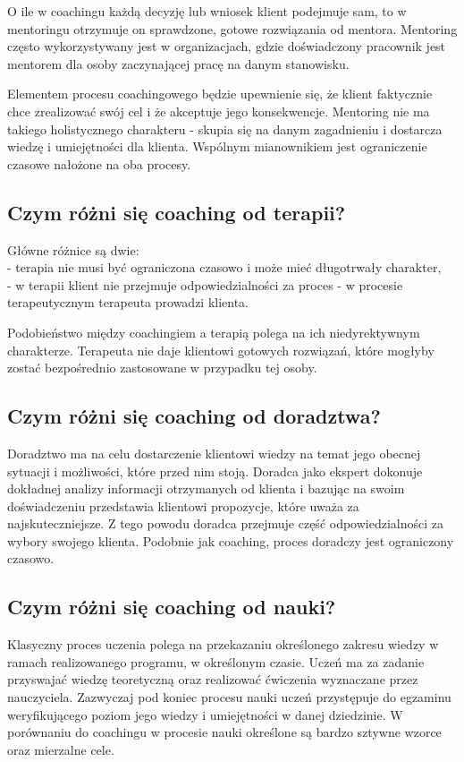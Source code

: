 O ile w coachingu każdą decyzję lub wniosek klient podejmuje sam, to w mentoringu otrzymuje on sprawdzone, gotowe rozwiązania od mentora.
Mentoring często wykorzystywany jest w organizacjach, gdzie doświadczony pracownik jest mentorem dla osoby zaczynającej pracę na danym stanowisku.

Elementem procesu coachingowego będzie upewnienie się, że klient faktycznie chce zrealizować swój cel i że akceptuje jego konsekwencje.
Mentoring nie ma takiego holistycznego charakteru - skupia się na danym zagadnieniu i dostarcza wiedzę i umiejętności dla klienta.
Wspólnym mianownikiem jest ograniczenie czasowe nałożone na oba procesy.

\subsection{Czym różni się coaching od terapii?}
Główne różnice są dwie: \\
- terapia nie musi być ograniczona czasowo i może mieć długotrwały charakter, \\
- w terapii klient nie przejmuje odpowiedzialności za proces - w procesie terapeutycznym terapeuta prowadzi klienta.

Podobieństwo między coachingiem a terapią polega na ich niedyrektywnym charakterze. Terapeuta nie daje klientowi gotowych rozwiązań, które mogłyby
zostać bezpośrednio zastosowane w przypadku tej osoby.

\subsection{Czym różni się coaching od doradztwa?}
Doradztwo ma na celu dostarczenie klientowi wiedzy na temat jego obecnej sytuacji i możliwości, które przed nim stoją. Doradca jako ekspert dokonuje
dokładnej analizy informacji otrzymanych od klienta i bazując na swoim doświadczeniu przedstawia klientowi propozycje, które uważa za najskuteczniejsze.
Z tego powodu doradca przejmuje część odpowiedzialności za wybory swojego klienta. Podobnie jak coaching, proces doradczy jest ograniczony czasowo.

\subsection{Czym różni się coaching od nauki?}

Klasyczny proces uczenia polega na przekazaniu określonego zakresu wiedzy w ramach realizowanego programu, w określonym czasie. Uczeń ma za zadanie
przyswajać wiedzę teoretyczną oraz realizować ćwiczenia wyznaczane przez nauczyciela. Zazwyczaj pod koniec procesu nauki uczeń przystępuje do egzaminu
weryfikującego poziom jego wiedzy i umiejętności w danej dziedzinie. W porównaniu do coachingu w procesie nauki określone są bardzo sztywne wzorce
oraz mierzalne cele.

